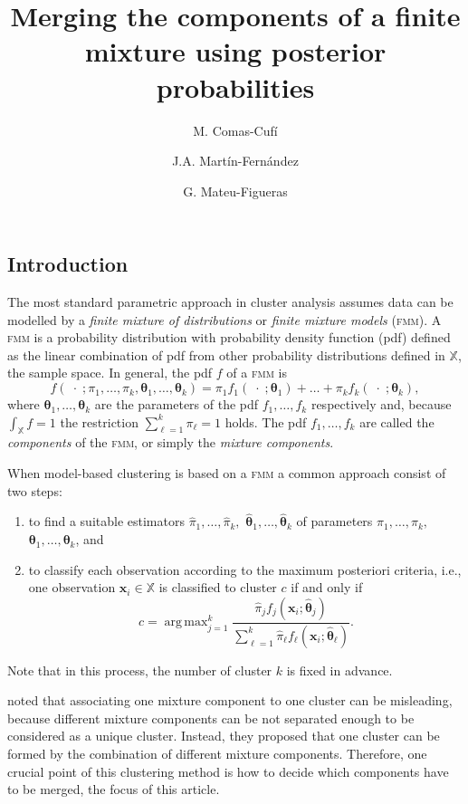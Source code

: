 \documentclass[10pt, a4paper]{article}
\title{Merging the components of a finite mixture using  posterior probabilities}
\author{M. Comas-Cufí \and J.A. Martín-Fernández \and G. Mateu-Figueras}
\DeclareMathOperator*{\argmax}{arg\,max}
\newcommand{\m}[1]{\boldsymbol{#1}}
\newcommand{\fmm}{\textsc{fmm}\xspace}
\begin{document}
\begin{spacing}{1.9}


\maketitle

\section{Introduction}

The most standard parametric approach in cluster analysis assumes data can be modelled by a \emph{finite mixture of distributions} or \emph{finite mixture models} (\fmm). A \fmm is a probability distribution with probability density function (pdf) defined as the linear combination of pdf from other probability distributions defined in $\mathbb{X}$, the sample space. In general, the pdf $f$ of a \fmm is
\begin{equation}\label{mixt}
f(\;\cdot\; ; \pi_1, \dots, \pi_k, \m\theta_1, \dots, \m\theta_k) = \pi_1 f_1(\;\cdot\; ; \m\theta_1) + \dots + \pi_k f_k(\;\cdot\; ; \m\theta_k),
\end{equation}
where $\m\theta_1, \dots,  \m\theta_k$ are the parameters of the pdf $f_1, \dots, f_k$ respectively and, because $\int_{\mathbb{X}}f = 1$ the restriction $\sum_{\ell = 1}^k \pi_\ell = 1$ holds. The pdf $f_1, \dots, f_k$ are called the \emph{components} of the \fmm, or simply the \emph{mixture components}.


When model-based clustering is based on a \fmm a common approach consist of two steps:
\begin{enumerate}
\item to find a suitable estimators $\hat{\pi}_1, \dots, \hat{\pi}_k,$ $\hat{\m\theta}_1, \dots, \hat{\m\theta}_k$ of parameters $\pi_1, \dots, \pi_k,$ $\m\theta_1, \dots, \m\theta_k$, and
\item to classify each observation according to the maximum posteriori criteria, i.e., one observation $\m x_i \in \mathbb{X}$ is classified to cluster $c$ if and only if
\[
c=\argmax_{j=1}^k \frac{ \hat{\pi}_j f_j(\m x_i ; \hat{\m\theta}_j) }{\sum_{\ell=1}^k \hat{\pi}_\ell f_\ell(\m x_i ; \hat{\m\theta}_\ell) }.
\]
\end{enumerate}
Note that in this process, the number of cluster $k$ is fixed in advance.

\cite{lee2004combining,hennig2010methods,baudry2010combining,melnykov2013distribution,pastore2013merging} noted that associating one mixture component to one cluster can be misleading, because different mixture components can be not separated enough to be considered as a unique cluster. Instead, they proposed that one cluster can be formed by the combination of different mixture components. Therefore, one crucial point of this clustering method is how to decide which components have to be merged, the focus of this article.


\end{spacing}
\end{document}
